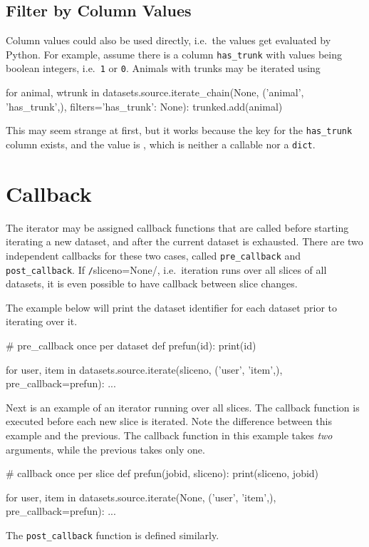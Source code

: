 \subsection*{Filter by Column Values}


Column values could also be used directly, i.e.\ the values get
evaluated by Python.  For example, assume there is a column
\texttt{has\_trunk} with values being boolean integers, i.e.\ \texttt{1}
or \texttt{0}.  Animals with trunks may be iterated using
\begin{python}
for animal, wtrunk in datasets.source.iterate_chain(None, ('animal', 'has_trunk',),
                                       filters={'has_trunk': None}):
    trunked.add(animal)
\end{python}
This may seem strange at first, but it works because the key for
the \texttt{has\_trunk} column exists, and the value is
\pyNone, which is neither a callable nor a \texttt{dict}.




\section{Callback}
\label{sec:callback}
The iterator may be assigned callback functions that are called before
starting iterating a new dataset, and after the current dataset is
exhausted.  There are two independent callbacks for these two cases,
called \texttt{pre\_callback} and \texttt{post\_callback}.
If \texttt/sliceno=None/, i.e.\ iteration runs over all
slices of all datasets, it is even possible to have callback between
slice changes.

The example below will print the dataset identifier for each dataset
prior to iterating over it.
\begin{python}
# pre_callback once per dataset
def prefun(id):
    print(id)

for user, item in datasets.source.iterate(sliceno, ('user', 'item',),
                                       pre_callback=prefun):
    ...
\end{python}
Next is an example of an iterator running over all slices.  The
callback function is executed before each new slice is iterated.  Note
the difference between this example and the previous.  The callback
function in this example takes \emph{two} arguments, while the
previous takes only one.
\begin{python}
# callback once per slice
def prefun(jobid, sliceno):
    print(sliceno, jobid)

for user, item in datasets.source.iterate(None, ('user', 'item',),
                                       pre_callback=prefun):
    ...
\end{python}
The \texttt{post\_callback} function is defined similarly.



